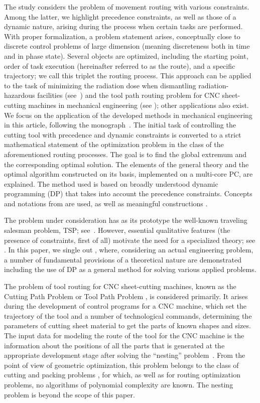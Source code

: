 The study considers the problem of movement routing
with various constraints.
Among the latter, we highlight
precedence constraints,
as well as those of a dynamic nature,
arising during the process when certain tasks are performed.
With proper formalization, a problem statement arises,
conceptually close to discrete control problems of large dimension
(meaning discreteness both in time and in phase state).
Several objects are optimized,
including the starting point,
order of task execution
(hereinafter referred to as the route),
and a specific trajectory;
we call this triplet
the routing process.
This approach can be applied
to the task of minimizing the radiation dose
when dismantling radiation-hazardous facilities
(see~\cite {1,3})
and the tool path routing problem
for CNC sheet-cutting machines
in mechanical engineering (see \cite {4,5});
other applications also exist.
We focus on the application of the developed methods in mechanical engineering
in this article,
following the monograph~\cite{4}.
The initial task of controlling the cutting tool
with precedence and dynamic constraints
is converted to a strict mathematical statement of
the optimization problem
in the class of the aforementioned routing processes.
The goal is to find
the global extremum and the corresponding optimal solution.
The elements of the general theory and
the optimal algorithm constructed on its basis,
implemented on a multi-core PC,
are explained.
The method used is based on
broadly understood dynamic programming
(DP)
that takes into account the precedence constraints.
Concepts and notations from
\cite[part II]{4}
are used,
as well as
meaningful constructions
\cite[part I]{4}.

The problem under consideration
has as its prototype the well-known
traveling salesman problem,
TSP;
see~\cite{7,8,9,10,11,12}.
However, essential qualitative features
(the presence of constraints, first of all)
motivate the need for a specialized theory;
see \cite {1,3,4,5,14}.
In this paper,
we single out \cite{4},
where, considering an actual engineering problem,
a number of fundamental provisions of a theoretical nature
are demonstrated including the use of DP
as a general method for solving various applied problems.

The problem of tool routing for CNC sheet-cutting machines,
known as the Cutting Path Problem or Tool Path Problem \cite{bibx:100},
is considered primarily.
It arises during the development of control programs for a CNC machine,
which set the trajectory of the tool and a number of technological commands,
determining the parameters of cutting sheet material to get
the parts of known shapes and sizes.
The input data for modeling the route of the tool for the CNC machine
is the information about the positions of all the parts
that is generated at the appropriate development stage
after solving the ``nesting'' problem~\cite{bibx:101, bibx:102}.
From the point of view of geometric optimization,
this problem belongs to the class of cutting and packing problems
\cite{bibx:103},
for which, as well as for routing optimization problems,
no algorithms of polynomial complexity are known.
The nesting problem is beyond the scope of this paper.

